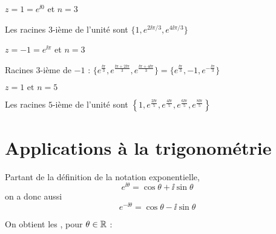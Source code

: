\begin{frame}

$z=1=e^{\ii 0}$ et $n=3$

Les racines $3$-ième de l'unité sont $\{1,e^{2\ii \pi/3},e^{4\ii \pi/3}\}$

\medskip


\begin{minipage}{.4\textwidth}
\end{minipage} \pause\hspace*{1cm}
\begin{minipage}{.4\textwidth}
\end{minipage}

\medskip

$z=-1=e^{\ii \pi}$ et $n=3$

Racines $3$-ième de $-1$ : $\{ e^{\frac{\ii\pi}{3}}, e^{\frac{\ii\pi+2\ii \pi}{3}}, e^{\frac{\ii\pi+4\ii \pi}{3}}\}
=\{ e^{\frac{\ii\pi}{3}}, -1, e^{-\frac{\ii\pi}{3}} \}$

 
\end{frame}


\begin{frame}
$z=1 \text{ et } n=5$

Les racines $5$-ième de l'unité sont 
$\displaystyle \left\{ 1,e^{\frac{2\ii\pi}{5}}, e^{\frac{4\ii\pi}{5}}, e^{\frac{6\ii\pi}{5}},e^{\frac{8\ii\pi}{5}}\right\}$


\end{frame}



\section{Applications \`a la trigonom\'etrie}

\begin{frame}

Partant de la définition de la notation exponentielle, 
$$e^{\ii  \theta} = \cos \theta + \ii  \sin \theta$$
\pause
on a donc aussi
$$e^{-\ii  \theta} = \cos \theta - \ii  \sin \theta$$

\bigskip

\pause

On obtient les , pour $\theta \in \mathbb{R}$ :




\end{frame}


